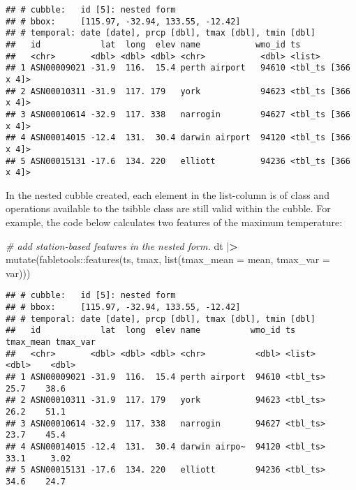 \documentclass{article}
\newenvironment{Shaded}{\begin{snugshade}}{\end{snugshade}}
\newcommand{\AttributeTok}[1]{\textcolor[rgb]{0.77,0.63,0.00}{#1}}
\newcommand{\CommentTok}[1]{\textcolor[rgb]{0.56,0.35,0.01}{\textit{#1}}}
\newcommand{\ErrorTok}[1]{\textcolor[rgb]{0.64,0.00,0.00}{\textbf{#1}}}
\newcommand{\FunctionTok}[1]{\textcolor[rgb]{0.00,0.00,0.00}{#1}}
\newcommand{\NormalTok}[1]{#1}
\newcommand{\SpecialCharTok}[1]{\textcolor[rgb]{0.00,0.00,0.00}{#1}}
\begin{document}
\begin{verbatim}
## # cubble:   id [5]: nested form
## # bbox:     [115.97, -32.94, 133.55, -12.42]
## # temporal: date [date], prcp [dbl], tmax [dbl], tmin [dbl]
##   id            lat  long  elev name           wmo_id ts                
##   <chr>       <dbl> <dbl> <dbl> <chr>           <dbl> <list>            
## 1 ASN00009021 -31.9  116.  15.4 perth airport   94610 <tbl_ts [366 x 4]>
## 2 ASN00010311 -31.9  117. 179   york            94623 <tbl_ts [366 x 4]>
## 3 ASN00010614 -32.9  117. 338   narrogin        94627 <tbl_ts [366 x 4]>
## 4 ASN00014015 -12.4  131.  30.4 darwin airport  94120 <tbl_ts [366 x 4]>
## 5 ASN00015131 -17.6  134. 220   elliott         94236 <tbl_ts [366 x 4]>
\end{verbatim}

In the nested cubble created, each element in the list-column  is of  class and operations available to the tsibble class are still valid within the cubble. For example, the code below calculates two features of the maximum temperature:

\begin{Shaded}
\begin{Highlighting}[]
\CommentTok{\# add station{-}based features in the nested form.}
\NormalTok{dt }\SpecialCharTok{|}\ErrorTok{\textgreater{}} \FunctionTok{mutate}\NormalTok{(fabletools}\SpecialCharTok{::}\FunctionTok{features}\NormalTok{(ts, tmax, }\FunctionTok{list}\NormalTok{(}\AttributeTok{tmax\_mean =}\NormalTok{ mean, }\AttributeTok{tmax\_var =}\NormalTok{ var)))}
\end{Highlighting}
\end{Shaded}

\begin{verbatim}
## # cubble:   id [5]: nested form
## # bbox:     [115.97, -32.94, 133.55, -12.42]
## # temporal: date [date], prcp [dbl], tmax [dbl], tmin [dbl]
##   id            lat  long  elev name          wmo_id ts       tmax_mean tmax_var
##   <chr>       <dbl> <dbl> <dbl> <chr>          <dbl> <list>       <dbl>    <dbl>
## 1 ASN00009021 -31.9  116.  15.4 perth airport  94610 <tbl_ts>      25.7    38.6 
## 2 ASN00010311 -31.9  117. 179   york           94623 <tbl_ts>      26.2    51.1 
## 3 ASN00010614 -32.9  117. 338   narrogin       94627 <tbl_ts>      23.7    45.4 
## 4 ASN00014015 -12.4  131.  30.4 darwin airpo~  94120 <tbl_ts>      33.1     3.02
## 5 ASN00015131 -17.6  134. 220   elliott        94236 <tbl_ts>      34.6    24.7
\end{verbatim}
\end{document}
